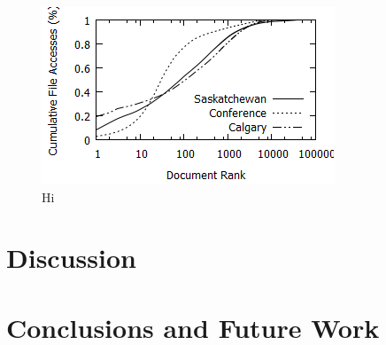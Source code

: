 \documentclass[10pt,conference]{IEEEtran}
\begin{document}
\begin{figure}
    \includegraphics{images/concentration}
    \caption{Hi}\label{fig:file_accesses}
\end{figure}

\section{Discussion}\label{discussion}

\section{Conclusions and Future Work}\label{conclusions}



\end{document}
